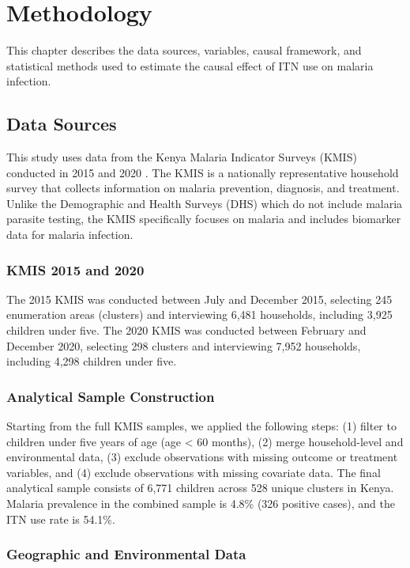 \chapter{Methodology}

This chapter describes the data sources, variables, causal framework, and statistical methods used to estimate the causal effect of ITN use on malaria infection.

\section{Data Sources}

This study uses data from the Kenya Malaria Indicator Surveys (KMIS) conducted in 2015 and 2020 \citep{kmis2015report, kmis2020report}. The KMIS is a nationally representative household survey that collects information on malaria prevention, diagnosis, and treatment. Unlike the Demographic and Health Surveys (DHS) which do not include malaria parasite testing, the KMIS specifically focuses on malaria and includes biomarker data for malaria infection.

\subsection{KMIS 2015 and 2020}

The 2015 KMIS was conducted between July and December 2015, selecting 245 enumeration areas (clusters) and interviewing 6,481 households, including 3,925 children under five. The 2020 KMIS was conducted between February and December 2020, selecting 298 clusters and interviewing 7,952 households, including 4,298 children under five.

\subsection{Analytical Sample Construction}

Starting from the full KMIS samples, we applied the following steps: (1) filter to children under five years of age (age < 60 months), (2) merge household-level and environmental data, (3) exclude observations with missing outcome or treatment variables, and (4) exclude observations with missing covariate data. The final analytical sample consists of 6,771 children across 528 unique clusters in Kenya. Malaria prevalence in the combined sample is 4.8\% (326 positive cases), and the ITN use rate is 54.1\%.

\subsection{Geographic and Environmental Data}

